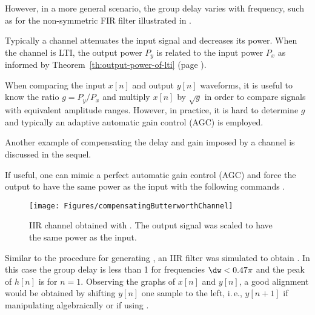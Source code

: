 However, in a more general scenario, the group delay varies with frequency, such as for the non-symmetric FIR filter illustrated in .

Typically a channel attenuates the input signal and decreases its power.
When the channel is LTI, the output power $P_y$ is related to the input power $P_x$ as informed by Theorem~\ref{th:output-power-of-lti} (page \pageref{th:output-power-of-lti}).

When comparing the input $x[n]$ and output $y[n]$ waveforms, it is useful to know the ratio $g = P_y / P_x$ and multiply $x[n]$ by $\sqrt{g}$ in order to compare signals with equivalent amplitude ranges. 
However, in practice, it is hard to determine $g$ and typically an adaptive automatic gain control (AGC) is employed. 

Another example of compensating the delay and gain imposed by a channel is discussed in the sequel.


If useful, one can mimic a perfect automatic gain control (AGC) and force the output to have the same power as the input with the following commands .

\begin{figure}[htbp]
\centering
\texttt{[image: Figures/compensatingButterworthChannel]}
\caption[{IIR channel obtained with .}]{IIR channel obtained with . The output signal was scaled to have the same power as the input.\label{fig:compensatingButterworthChannel}}
\end{figure}

Similar to the procedure for generating , an IIR filter was simulated to obtain 
. In this case the group delay is less than 1 for frequencies $\dw < 0.47 \pi$ and the peak of $h[n]$ is for $n=1$. Observing the graphs of $x[n]$ and $y[n]$, a good alignment would be obtained by shifting $y[n]$ one sample to the left, i.\,e., $y[n+1]$ if manipulating algebraically or  if using {\matlab}.
\eApplication



